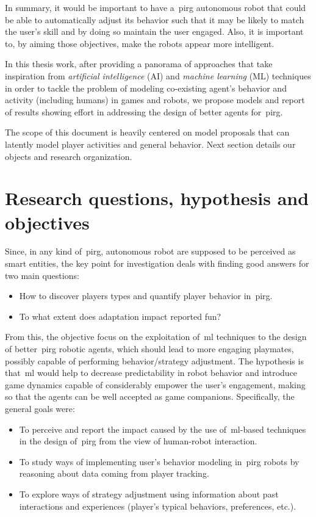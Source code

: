 In summary, it would be important to have a~\gls{pirg} autonomous robot that could be able to automatically adjust its behavior such that it may be likely to match the user's skill and by doing so maintain the user engaged. Also, it is important to, by aiming those objectives, make the robots appear more intelligent. 

In this thesis work, after providing a panorama of approaches that take inspiration from \textit{artificial intelligence} (AI) and \textit{machine learning} (ML) techniques in order to tackle the problem of modeling co-existing agent's behavior and activity (including humans) in games and robots, we propose models and report of results showing effort in addressing the design of better agents for~\gls{pirg}. 

The scope of this document is heavily centered on model proposals that can latently model player activities and general behavior.  Next section details our objects and research organization.

\section{Research questions, hypothesis and objectives}	
Since, in any kind of~\gls{pirg}, autonomous robot are supposed to be perceived as smart entities, the key point for investigation deals with finding good answers for two main questions:

\begin{itemize}
\item How to discover players types and quantify player behavior in~\gls{pirg}.
\item To what extent does adaptation impact reported fun?
\end{itemize}

From this, the objective focus on the exploitation of~\gls{ml} techniques to the design of better~\gls{pirg} robotic agents, which should lead to more engaging playmates, possibly capable of performing behavior/strategy adjustment. The hypothesis is that~\gls{ml} would help to decrease predictability in robot behavior and introduce game dynamics capable of considerably empower the user’s engagement, making so that the agents can be well accepted as game companions. Specifically, the general goals were:

\begin{itemize}
\item To perceive and report the impact caused by the use of~\gls{ml}-based techniques in the design of~\gls{pirg} from the view of human-robot interaction.
\item To study ways of implementing user's behavior modeling in~\gls{pirg} robots by reasoning about data coming from player tracking.
\item To explore ways of strategy adjustment using information about past interactions and experiences (player's typical behaviors, preferences, etc.).
\end{itemize}


